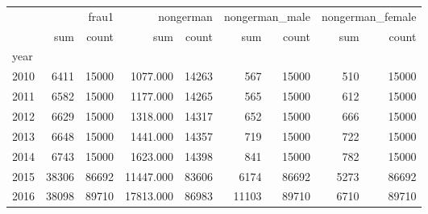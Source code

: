 \begin{tabular}{lrrrrrrrr}
\toprule
 & \multicolumn{2}{r}{frau1} & \multicolumn{2}{r}{nongerman} & \multicolumn{2}{r}{nongerman_male} & \multicolumn{2}{r}{nongerman_female} \\
 & sum & count & sum & count & sum & count & sum & count \\
year &  &  &  &  &  &  &  &  \\
\midrule
2010 & 6411 & 15000 & 1077.000 & 14263 & 567 & 15000 & 510 & 15000 \\
2011 & 6582 & 15000 & 1177.000 & 14265 & 565 & 15000 & 612 & 15000 \\
2012 & 6629 & 15000 & 1318.000 & 14317 & 652 & 15000 & 666 & 15000 \\
2013 & 6648 & 15000 & 1441.000 & 14357 & 719 & 15000 & 722 & 15000 \\
2014 & 6743 & 15000 & 1623.000 & 14398 & 841 & 15000 & 782 & 15000 \\
2015 & 38306 & 86692 & 11447.000 & 83606 & 6174 & 86692 & 5273 & 86692 \\
2016 & 38098 & 89710 & 17813.000 & 86983 & 11103 & 89710 & 6710 & 89710 \\
\bottomrule
\end{tabular}
